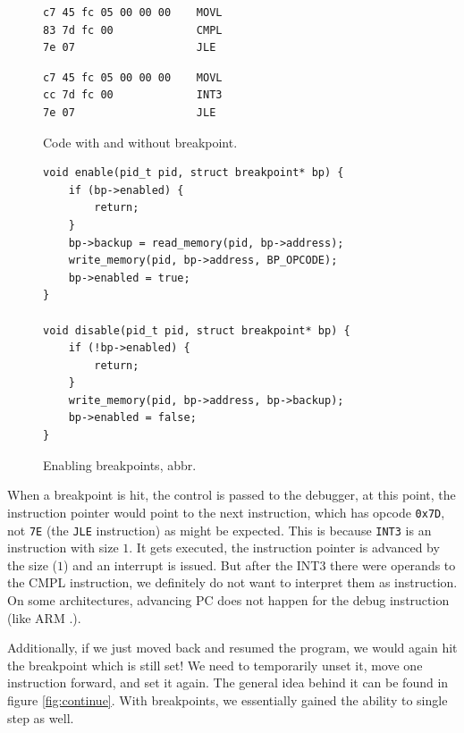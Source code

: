 \begin{figure}\label{fig:with-and-without-bp}
    \begin{minipage}{0.45\textwidth}
        \begin{lstlisting}
c7 45 fc 05 00 00 00 	MOVL
83 7d fc 00          	CMPL
7e 07                	JLE
        \end{lstlisting}
    \end{minipage}
    \begin{minipage}{0.45\textwidth}
        \begin{lstlisting}
c7 45 fc 05 00 00 00 	MOVL
cc 7d fc 00          	INT3
7e 07                	JLE
        \end{lstlisting}
    \end{minipage}
    \caption{Code with and without breakpoint.}
\end{figure}

\begin{figure}\label{fig:breakpoint-enable}
    \begin{verbatim}
void enable(pid_t pid, struct breakpoint* bp) {
    if (bp->enabled) {
        return;
    }
    bp->backup = read_memory(pid, bp->address);
    write_memory(pid, bp->address, BP_OPCODE);
    bp->enabled = true;
}

void disable(pid_t pid, struct breakpoint* bp) {
    if (!bp->enabled) {
        return;
    }
    write_memory(pid, bp->address, bp->backup);
    bp->enabled = false;
}
    \end{verbatim}
    \caption{Enabling breakpoints, abbr.}
\end{figure}

When a breakpoint is hit, the control is passed to the debugger, at this point,
the instruction pointer would point to the next instruction, which has opcode
\texttt{0x7D}, not \texttt{7E} (the \texttt{JLE} instruction) as might be
expected. This is because \texttt{INT3} is an instruction with size $1$. It
gets executed, the instruction pointer is advanced by the size ($1$) and an
interrupt is issued. But after the INT3 there were operands to the CMPL
instruction, we definitely do not want to interpret them as instruction. On
some architectures, advancing PC does not happen for the debug instruction
(like ARM .).

Additionally, if we just moved back and resumed the program, we would again hit
the breakpoint which is still set! We need to temporarily unset it, move one
instruction forward, and set it again. The general idea behind it can be found
in figure \ref{fig:continue}. With breakpoints, we essentially gained the
ability to single step as well. 

